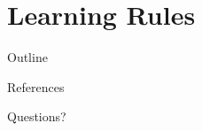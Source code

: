 \documentclass[10pt, notes]{beamer}
\begin{document}


\section{Learning Rules}
\begin{frame}{Outline}
    \tableofcontents[currentsection]
\end{frame}




\begin{frame}{References}
    \nocite{*}
    
    
\end{frame}

\begin{frame}[standout]
    Questions?
\end{frame}
\end{document}
